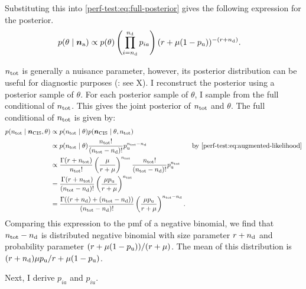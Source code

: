 \documentclass[thesis.tex]{subfiles}
\begin{document}
Substituting this into \cref{perf-test:eq:full-posterior} gives the following expression for the posterior.
\begin{align}
p(\theta \mid \bm{n_\text{a}})
&\propto p(\theta) \left( \prod_{i=n_\text{d}}^{n_\text{d}} p_{ia} \right) (r + \mu (1- p_\text{u}))^{-(r+n_\text{d})} \label{perf-test:eq:full-posterior-simplified}.
\end{align}

$n_\text{tot}$ is generally a nuisance parameter, however, its posterior distribution can be useful for diagnostic purposes (\eg: see X).
I reconstruct the posterior using a posterior sample of $\theta$.
For each posterior sample of $\theta$, I sample from the full conditional of $n_\text{tot}$.
This gives the joint posterior of $n_\text{tot}$ and $\theta$.
The full conditional of $n_\text{tot}$ is given by:
\begin{align}
p(n_\text{tot} \mid \ncis, \theta)
&\propto p(\ntot \mid \theta) p(\ncis \mid \theta, \ntot) \\
&\propto p(\ntot \mid \theta) \frac{\ntot!}{(\ntot - \ndet)!} \pnodet^{\ntot - \ndet} &\text{by \cref{perf-test:eq:augmented-likelihood}} \\
&\propto \frac{\Gamma(r + \ntot)}{\ntot!} \left( \frac{\mu}{r + \mu} \right)^{\ntot} \frac{\ntot!}{(\ntot-\ndet)!} \pnodet^{\ntot} \\
&= \frac{\Gamma(r + \ntot)}{(\ntot-\ndet)!} \left( \frac{\mu \pnodet}{r + \mu} \right)^{\ntot}  \\
&= \frac{\Gamma((r + \ndet) + (\ntot- \ndet))}{(\ntot-\ndet)!} \left( \frac{\mu \pnodet}{r + \mu} \right)^{\ntot-\ndet}.
\end{align}
Comparing this expression to the pmf of a negative binomial, we find that $n_\text{tot} - n_\text{d}$ is distributed negative binomial with size parameter $r+n_\text{d}$ and probability parameter $(r + \mu(1 - p_\text{u}))/(r + \mu)$.
The mean of this distribution is $(r+n_\text{d})\mu p_\text{u}/r+\mu(1-p_\text{u})$.

Next, I derive $p_{ia}$ and $p_{iu}$.
\end{document}
